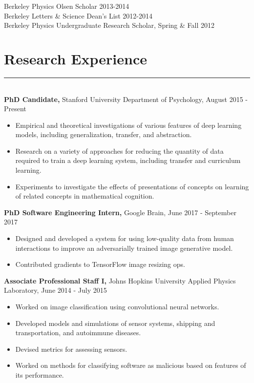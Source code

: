 \documentclass[margin]{res}
\begin{document}
\begin{resume}
Berkeley Physics Olsen Scholar 2013-2014 \\
Berkeley Letters \& Science Dean's List 2012-2014\\
Berkeley Physics Undergraduate Research Scholar, Spring \& Fall 2012
\vspace{1pt}\section{Research Experience} \vspace{-15pt} \rule{\textwidth}{0.5pt} \\[3pt]
{\bf PhD Candidate,} Stanford University Department of Psychology, August 2015 - Present 
\begin{itemize} \itemsep -2pt
  \item Empirical and theoretical investigations of various features of deep learning models, including generalization, transfer, and abstraction. 
  \item Research on a variety of approaches for reducing the quantity of data required to train a deep learning system, including transfer and curriculum learning.
  \item Experiments to investigate the effects of presentations of concepts on learning of related concepts in mathematical cognition.
\end{itemize}\vspace{-8pt}
{\bf PhD Software Engineering Intern,} Google Brain, June 2017 - September 2017 
\begin{itemize} \itemsep -2pt
  \item Designed and developed a system for using low-quality data from human interactions to improve an adversarially trained image generative model. 
  \item Contributed gradients to TensorFlow image resizing ops.
\end{itemize}\vspace{-8pt}
{\bf Associate Professional Staff I,} Johns Hopkins University Applied Physics Laboratory, June 2014 - July 2015 
\begin{itemize} \itemsep -2pt
 \item Worked on image classification using convolutional neural networks.  \item Developed models and simulations of sensor systems, shipping and transportation, and autoimmune diseases. \item Devised metrics for assessing sensors. \item Worked on methods for classifying software as malicious based on features of its performance. \end{itemize}\vspace{-8pt}

\end{resume}
\end{document}
